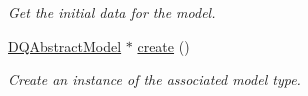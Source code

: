 \begin{DoxyCompactItemize}
\begin{DoxyCompactList}\small\item\em Get the initial data for the model. \item\end{DoxyCompactList}\item 
\hypertarget{classDQModelMetaInfo_a9ae4e5ef60edb74683b8edb9dc4d7f4f}{
\hyperlink{classDQAbstractModel}{DQAbstractModel} $\ast$ \hyperlink{classDQModelMetaInfo_a9ae4e5ef60edb74683b8edb9dc4d7f4f}{create} ()}
\label{classDQModelMetaInfo_a9ae4e5ef60edb74683b8edb9dc4d7f4f}

\begin{DoxyCompactList}\small\item\em Create an instance of the associated model type. \item\end{DoxyCompactList}\end{DoxyCompactItemize}
